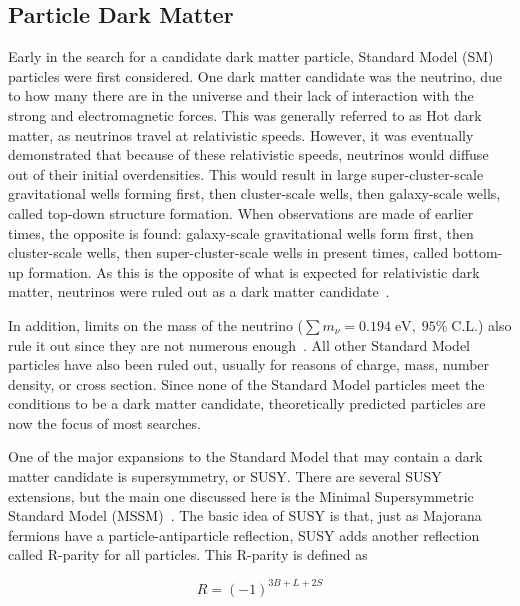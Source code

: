 \subsection{Particle Dark Matter}\label{sec_particledm}

Early in the search for a candidate dark matter particle, Standard Model (SM) particles were first considered.
One dark matter candidate was the neutrino, due to how many there are in the universe and their lack of interaction with the strong and electromagnetic forces.
This was generally referred to as Hot dark matter, as neutrinos travel at relativistic speeds.
However, it was eventually demonstrated that because of these relativistic speeds, neutrinos would diffuse out of their initial overdensities.
This would result in large super-cluster-scale gravitational wells forming first, then cluster-scale wells, then galaxy-scale wells, called top-down structure formation.
When observations are made of earlier times, the opposite is found: galaxy-scale gravitational wells form first, then cluster-scale wells, then super-cluster-scale wells in present times, called bottom-up formation.
As this is the opposite of what is expected for relativistic dark matter, neutrinos were ruled out as a dark matter candidate~\cite{neutrinoHeirarchical}.

In addition, limits on the mass of the neutrino ($\sum{}m_{\nu} = 0.194 \; \textrm{eV}, \; 95\% \; \textrm{C.L.}$) also rule it out since they are not numerous enough~\cite{planck2015}.
All other Standard Model particles have also been ruled out, usually for reasons of charge, mass, number density, or cross section.
Since none of the Standard Model particles meet the conditions to be a dark matter candidate, theoretically predicted particles are now the focus of most searches.

One of the major expansions to the Standard Model that may contain a dark matter candidate is supersymmetry, or SUSY.
There are several SUSY extensions, but the main one discussed here is the Minimal Supersymmetric Standard Model (MSSM)~\cite{MSSM,supersym1,schelke_thesis}.
The basic idea of SUSY is that, just as Majorana fermions have a particle-antiparticle reflection, SUSY adds another reflection called R-parity for all particles. 
This R-parity is defined as

\begin{equation}
  R = (-1)^{3B+L+2S}
\end{equation}

